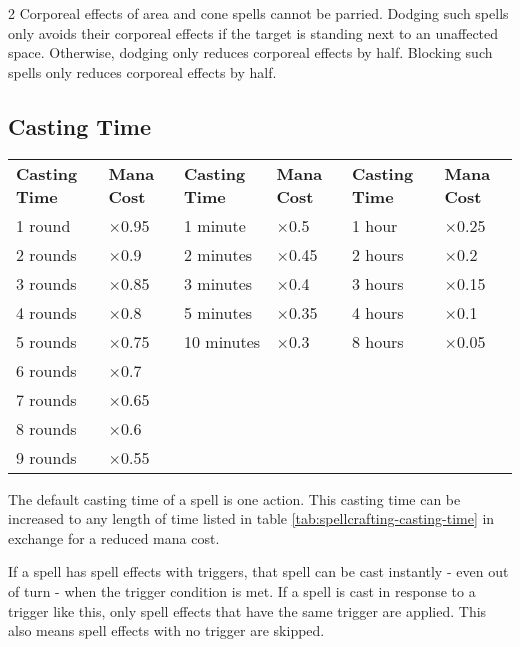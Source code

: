 \begin{multicols*}{2}
    Corporeal effects of area and cone spells cannot be parried. Dodging such
    spells only avoids their corporeal effects if the target is standing next
    to an unaffected space. Otherwise, dodging only reduces corporeal effects
    by half. Blocking such spells only reduces corporeal effects by half.

    \subsection{Casting Time}
    \begin{table*}[ht]
        \unclassedrowcolors
        \begin{tabularx}{\textwidth}{l X l X l X}
            \textbf{Casting Time} & \textbf{Mana Cost} & \textbf{Casting Time} & \textbf{Mana Cost} & \textbf{Casting Time} & \textbf{Mana Cost} \\
            1 round  & $\times$0.95 & 1 minute   & $\times$0.5  & 1 hour  & $\times$0.25 \\
            2 rounds & $\times$0.9  & 2 minutes  & $\times$0.45 & 2 hours & $\times$0.2  \\
            3 rounds & $\times$0.85 & 3 minutes  & $\times$0.4  & 3 hours & $\times$0.15 \\
            4 rounds & $\times$0.8  & 5 minutes  & $\times$0.35 & 4 hours & $\times$0.1  \\
            5 rounds & $\times$0.75 & 10 minutes & $\times$0.3  & 8 hours & $\times$0.05 \\
            6 rounds & $\times$0.7  & & & & \\
            7 rounds & $\times$0.65 & & & & \\
            8 rounds & $\times$0.6  & & & & \\
            9 rounds & $\times$0.55 & & & & \\
        \end{tabularx}
        \caption{Spellcrafting Casting Time}
        \label{tab:spellcrafting-casting-time}
    \end{table*}
    The default casting time of a spell is one action. This casting time
    can be increased to any length of time listed in table
    \ref{tab:spellcrafting-casting-time} in exchange for a reduced mana cost.

    If a spell has spell effects with triggers, that spell can be cast
    instantly - even out of turn - when the trigger condition is met. If a
    spell is cast in response to a trigger like this, only spell effects
    that have the same trigger are applied. This also means spell effects
    with no trigger are skipped.


\end{multicols*}
